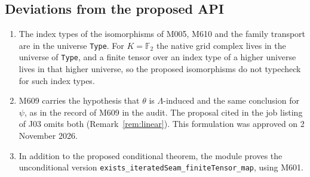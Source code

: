 \documentclass[11pt]{amsart}
\theoremstyle{definition}
\theoremstyle{remark}
\newcommand{\lean}[1]{\textnormal{\nolinkurl{#1}}}
\newcommand{\Lam}{\Lambda}
\newcommand{\F}{\mathbb{F}_2}
\begin{document}
\subsection*{Deviations from the proposed API}
\begin{enumerate}
\item The index types of the isomorphisms of M005, M610 and the family transport are in the
universe \lean{Type}. For $K=\F$ the native grid complex lives in the universe of
\lean{Type}, and a finite tensor over an index type of a higher universe lives in that higher
universe, so the proposed isomorphisms do not typecheck for such index types.
\item M609 carries the hypothesis that $\theta$ is $\Lam$-induced and the same conclusion for
$\psi$, as in the record of M609 in the audit. The proposal cited in the job listing of J03 omits
both (Remark~\ref{rem:linear}). This formulation was approved on 2 November 2026.
\item In addition to the proposed conditional theorem, the module proves the unconditional
version \lean{exists_iteratedSeam_finiteTensor_map}, using M601.
\end{enumerate}
\end{document}
